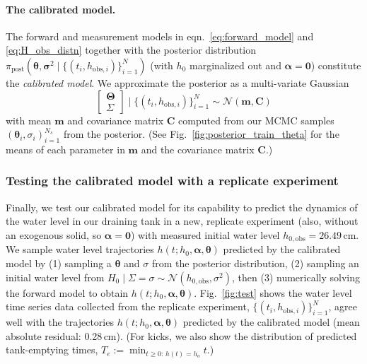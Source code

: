 \documentclass[openacc]{rsproca_new}%
\newcommand\thedata {$\{(t_i,h_{\text{obs}, i})\}_{i=1}^{N}$\xspace}
\newcommand\thedatanomath {\{(t_i,h_{\text{obs}, i})\}_{i=1}^{N}}
\newcommand\themodel {$h(t; h_0, \boldsymbol \alpha, \boldsymbol\theta)$\xspace}
\begin{document}
\paragraph{The calibrated model.} The forward and measurement models in eqn.~\ref{eq:forward_model} and \ref{eq:H_obs_distn} together with the posterior distribution $\pi_{\text{post}}(\boldsymbol \theta, \boldsymbol \sigma^2 \mid \thedatanomath)$ (with $h_0$ marginalized out and $\boldsymbol \alpha=\mathbf{0}$) constitute the \emph{calibrated model}.
We approximate the posterior as a multi-variate Gaussian
\begin{equation}
	\begin{bmatrix} \boldsymbol \Theta \\ \Sigma \end{bmatrix} \mid \thedatanomath \sim \mathcal{N}(\mathbf{m}, \mathbf{C}) \label{eq:post_theta_sigma}
\end{equation}
with mean $\mathbf{m}$ and covariance matrix $\mathbf{C}$ computed from our MCMC samples $(\boldsymbol \theta_i, \sigma_i)_{i=1}^{N_s}$ from the posterior. 
(See Fig.~\ref{fig:posterior_train_theta} for the means of each parameter in $\mathbf{m}$ and the covariance matrix $\mathbf{C}$.)

\subsubsection{Testing the calibrated model with a replicate experiment}
Finally, we test our calibrated model for its capability to predict the dynamics of the water level in our draining tank in a new, replicate experiment (also, without an exogenous solid, so $\boldsymbol \alpha=\mathbf{0}$) with measured initial water level $h_{0, \text{obs}}=26.49$\,cm. 
We sample water level trajectories \themodel predicted by the calibrated model by (1) sampling a $\boldsymbol \theta$ and $\sigma$ from the posterior distribution, (2) sampling an initial water level from $H_0 \mid \Sigma=\sigma \sim \mathcal{N}(h_{0, \text{obs}}, \sigma^2)$, then (3) numerically solving the forward model to obtain \themodel.
Fig.~\ref{fig:test} shows the water level time series data collected from the replicate experiment, \thedata, agree well with the trajectories \themodel predicted by the calibrated model (mean absolute residual: 0.28\,cm). 
(For kicks, we also show the distribution of predicted tank-emptying times, $T_e := \min_{t \geq 0 :\, h(t)=h_o} t$.)
\end{document}
